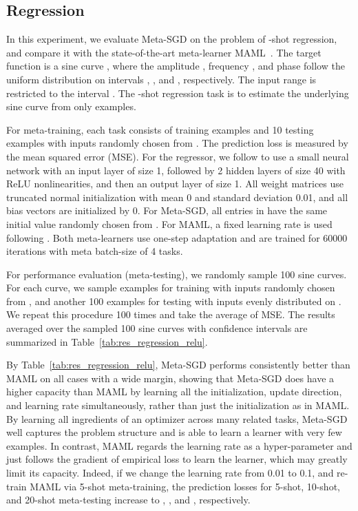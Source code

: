 \documentclass{article}
\begin{document}
\subsection{Regression}





In this experiment, we evaluate Meta-SGD on the problem of -shot regression, and compare it with the state-of-the-art meta-learner MAML~\cite{finn2017model}. The target function is a sine curve , where the amplitude , frequency , and phase  follow the uniform distribution on intervals , , and , respectively. The input range is restricted to the interval . The -shot regression task is to estimate the underlying sine curve from only  examples.

For meta-training, each task consists of  training examples and 10 testing examples with inputs randomly chosen from . The prediction loss is measured by the mean squared error (MSE). For the regressor, we follow \cite{finn2017model} to use a small neural network with an input layer of size 1, followed by 2 hidden layers of size 40 with ReLU nonlinearities, and then an output layer of size 1. All weight matrices use truncated normal initialization with mean 0 and standard deviation 0.01, and all bias vectors are initialized by 0. For Meta-SGD, all entries in  have the same initial value randomly chosen from . For MAML, a fixed learning rate  is used following \cite{finn2017model}. Both meta-learners use one-step adaptation and are trained for 60000 iterations with meta batch-size of 4 tasks.

For performance evaluation (meta-testing), we randomly sample 100 sine curves. For each curve, we sample  examples for training with inputs randomly chosen from , and another 100 examples for testing with inputs evenly distributed on .
We repeat this procedure 100 times and take the average of MSE. The results averaged over the sampled 100 sine curves with  confidence intervals are summarized in Table~\ref{tab:res_regression_relu}.


By Table~\ref{tab:res_regression_relu}, Meta-SGD performs consistently better than MAML on all cases with a wide margin, showing that Meta-SGD does have a higher capacity than MAML by learning all the initialization, update direction, and learning rate simultaneously, rather than just the initialization as in MAML. By learning all ingredients of an optimizer across many related tasks, Meta-SGD well captures the problem structure and is able to learn a learner with very few examples.
In contrast, MAML regards the learning rate  as a hyper-parameter and just follows the gradient of empirical loss to learn the learner, which may greatly limit its capacity. Indeed, if we change the learning rate  from 0.01 to 0.1, and re-train MAML via 5-shot meta-training, the prediction losses for 5-shot, 10-shot, and 20-shot meta-testing increase to , , and , respectively.
\end{document}
